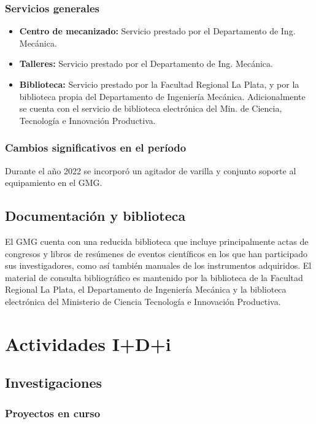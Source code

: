 \documentclass[a4paper,11pt,twoside,final,titlepage,onecolumn,openright]{report}
\begin{document}
\subsection{Servicios generales}

\begin{itemize}
 \item {\bf Centro de mecanizado:} Servicio prestado por el Departamento de Ing. Mecánica.
 \item {\bf Talleres:} Servicio prestado por el Departamento de Ing. Mecánica.
 \item {\bf Biblioteca:} Servicio prestado por la Facultad Regional La Plata, y por la biblioteca propia del Departamento de Ingeniería Mecánica. Adicionalmente se cuenta con el servicio de biblioteca electrónica del Min. de Ciencia, Tecnología e Innovación Productiva. 
\end{itemize}

\subsection{Cambios significativos en el período}
Durante el año 2022 se incorporó un agitador de varilla y conjunto soporte al equipamiento en el GMG.

\section{Documentación y biblioteca}

El GMG cuenta con una reducida biblioteca que incluye principalmente actas de congresos y libros de resúmenes de eventos científicos en los que han participado sus investigadores, como así también manuales de los instrumentos adquiridos. El material de consulta bibliográfico es mantenido por la biblioteca de la Facultad Regional La Plata, el Departamento de Ingeniería Mecánica y la biblioteca electrónica del Ministerio de Ciencia Tecnología e Innovación Productiva. 

\chapter{Actividades I+D+i}

\section{Investigaciones}

\subsection{Proyectos en curso}
\end{document}
